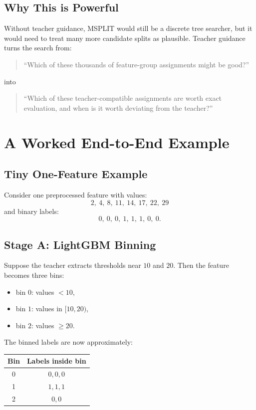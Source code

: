 \documentclass[11pt]{article}
\begin{document}
\subsection{Why This is Powerful}

Without teacher guidance, MSPLIT would still be a discrete tree searcher, but it would need to treat many more candidate splits as plausible. Teacher guidance turns the search from:

\begin{quote}
``Which of these thousands of feature-group assignments might be good?''
\end{quote}

into

\begin{quote}
``Which of these teacher-compatible assignments are worth exact evaluation, and when is it worth deviating from the teacher?''
\end{quote}

\section{A Worked End-to-End Example}

\subsection{Tiny One-Feature Example}

Consider one preprocessed feature with values:
\[
2,\ 4,\ 8,\ 11,\ 14,\ 17,\ 22,\ 29
\]
and binary labels:
\[
0,\ 0,\ 0,\ 1,\ 1,\ 1,\ 0,\ 0.
\]

\subsection{Stage A: LightGBM Binning}

Suppose the teacher extracts thresholds near \(10\) and \(20\). Then the feature becomes three bins:

\begin{itemize}
\item bin \(0\): values \(< 10\),
\item bin \(1\): values in \([10,20)\),
\item bin \(2\): values \(\ge 20\).
\end{itemize}

The binned labels are now approximately:

\begin{center}
\begin{tabular}{|c|c|}
\hline
Bin & Labels inside bin \\
\hline
0 & \(0,0,0\) \\
1 & \(1,1,1\) \\
2 & \(0,0\) \\
\hline
\end{tabular}
\end{center}
\end{document}
